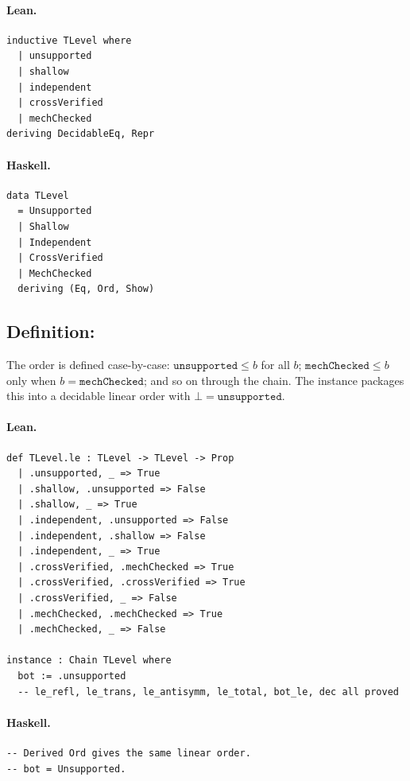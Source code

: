 \documentclass[11pt,a4paper]{article}
\begin{document}
\paragraph{Lean.}
\begin{lstlisting}[style=lean]
inductive TLevel where
  | unsupported
  | shallow
  | independent
  | crossVerified
  | mechChecked
deriving DecidableEq, Repr
\end{lstlisting}

\paragraph{Haskell.}
\begin{lstlisting}[style=haskell]
data TLevel
  = Unsupported
  | Shallow
  | Independent
  | CrossVerified
  | MechChecked
  deriving (Eq, Ord, Show)
\end{lstlisting}


\subsection{Definition: }

\begin{defn}
The order is defined case-by-case: $\mathtt{unsupported} \le b$ for all $b$;
$\mathtt{mechChecked} \le b$ only when $b = \mathtt{mechChecked}$; and so on
through the chain.  The  instance packages this into a
decidable linear order with $\bot = \mathtt{unsupported}$.
\end{defn}

\paragraph{Lean.}
\begin{lstlisting}[style=lean]
def TLevel.le : TLevel -> TLevel -> Prop
  | .unsupported, _ => True
  | .shallow, .unsupported => False
  | .shallow, _ => True
  | .independent, .unsupported => False
  | .independent, .shallow => False
  | .independent, _ => True
  | .crossVerified, .mechChecked => True
  | .crossVerified, .crossVerified => True
  | .crossVerified, _ => False
  | .mechChecked, .mechChecked => True
  | .mechChecked, _ => False

instance : Chain TLevel where
  bot := .unsupported
  -- le_refl, le_trans, le_antisymm, le_total, bot_le, dec all proved
\end{lstlisting}

\paragraph{Haskell.}
\begin{lstlisting}[style=haskell]
-- Derived Ord gives the same linear order.
-- bot = Unsupported.
\end{lstlisting}
\end{document}
